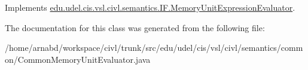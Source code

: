 Implements \hyperlink{interfaceedu_1_1udel_1_1cis_1_1vsl_1_1civl_1_1semantics_1_1IF_1_1MemoryUnitExpressionEvaluator}{edu.\+udel.\+cis.\+vsl.\+civl.\+semantics.\+I\+F.\+Memory\+Unit\+Expression\+Evaluator}.



The documentation for this class was generated from the following file\+:\begin{DoxyCompactItemize}
\item 
/home/arnabd/workspace/civl/trunk/src/edu/udel/cis/vsl/civl/semantics/common/Common\+Memory\+Unit\+Evaluator.\+java\end{DoxyCompactItemize}

